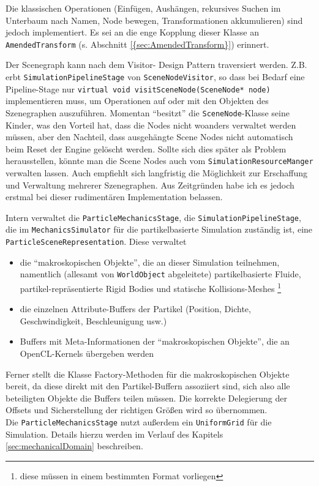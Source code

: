 	Die klassischen Operationen (Einfügen, Aushängen, rekursives Suchen im Unterbaum nach Namen, Node bewegen,
	Transformationen akkumulieren) sind jedoch implementiert. Es sei an die enge Kopplung dieser Klasse an
	\lstinline|AmendedTransform| (s. Abschnitt \ref{{sec:AmendedTransform}}) erinnert.
	
	Der Scenegraph kann nach dem Visitor- Design Pattern traversiert werden. Z.B. erbt 
	\lstinline|SimulationPipelineStage| von \lstinline|SceneNodeVisitor|, so dass bei Bedarf eine Pipeline-Stage
	nur \lstinline|virtual void visitSceneNode(SceneNode* node)| implementieren muss, um Operationen auf oder mit
	den Objekten des Szenegraphen auszuführen.
	Momentan "`besitzt"' die \lstinline|SceneNode|-Klasse seine Kinder, was den Vorteil hat, dass die Nodes nicht woanders
	verwaltet werden müssen, aber den Nachteil, dass ausgehängte Scene Nodes nicht automatisch beim Reset der Engine
	gelöscht werden. Sollte sich dies später als Problem herausstellen, könnte man die Scene Nodes auch vom
	\lstinline|SimulationResourceManger| verwalten lassen.
	Auch empfiehlt sich langfristig die Möglichkeit zur Erschaffung und Verwaltung mehrerer Szenegraphen.
	Aus Zeitgründen habe ich es jedoch erstmal bei dieser rudimentären Implementation belassen.
	
	Intern verwaltet die \lstinline|ParticleMechanicsStage|, die \lstinline|SimulationPipelineStage|,
	die im \lstinline|MechanicsSimulator| für die partikelbasierte Simulation zuständig ist, 
	eine \lstinline|ParticleSceneRepresentation|. Diese verwaltet 
	\begin{itemize}
		\item die "`makroskopischen Objekte"', die an dieser Simulation teilnehmen,
		namentlich (allesamt von \lstinline|WorldObject| abgeleitete) 
		partikelbasierte Fluide, partikel-repräsentierte Rigid Bodies und statische Kollisions-Meshes
		\footnote{diese müssen in einem bestimmten Format vorliegen}
		\item die einzelnen Attribute-Buffers der Partikel
			(Position, Dichte, Geschwindigkeit, Beschleunigung usw.)
		\item Buffers mit Meta-Informationen der "`makroskopischen Objekte"', die an OpenCL-Kernels übergeben werden
	\end{itemize}
	Ferner stellt die Klasse Factory-Methoden für die makroskopischen Objekte bereit, da diese direkt mit den
	Partikel-Buffern assoziiert sind, sich also alle beteiligten Objekte die Buffers teilen müssen. Die korrekte
	Delegierung der Offsets und Sicherstellung der richtigen Größen wird so übernommen.\\
	Die \lstinline|ParticleMechanicsStage| nutzt außerdem ein \lstinline|UniformGrid| für die Simulation.
	Details hierzu werden im Verlauf des Kapitels \ref{sec:mechanicalDomain} beschreiben.
	
